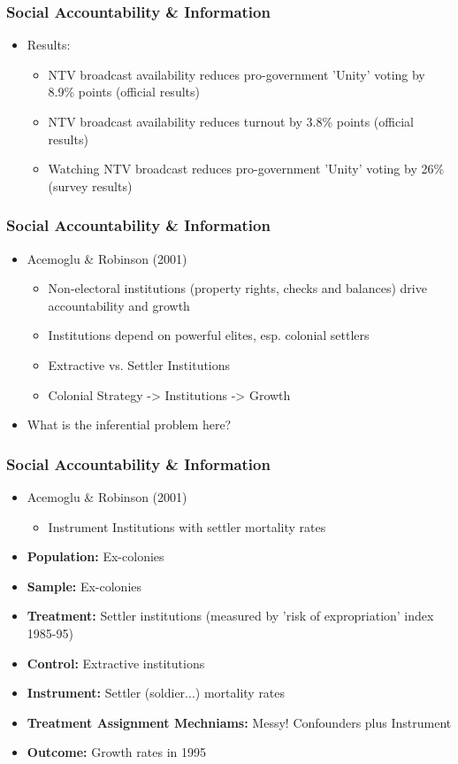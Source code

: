 \documentclass[xcolor=x11names,compress]{beamer}\usepackage[]{graphicx}\usepackage[]{color}
\renewcommand{\(}{\begin{columns}}
\renewcommand{\)}{\end{columns}}
\newcommand{\<}[1]{\begin{column}{#1}}
\renewcommand{\>}{\end{column}}
\begin{document}
\begin{frame}
\frametitle{Social Accountability \& Information}
\begin{itemize}
\item Results:
\pause
\begin{itemize}
\item NTV broadcast availability reduces pro-government 'Unity' voting by 8.9\% points (official results)
\item NTV broadcast availability reduces turnout by 3.8\% points (official results)
\item Watching NTV broadcast reduces pro-government 'Unity' voting by 26\% (survey results)
\end{itemize}
\end{itemize}
\end{frame}

\begin{frame}
\frametitle{Social Accountability \& Information}
\begin{itemize}
\item Acemoglu \& Robinson (2001)
\begin{itemize}
\item Non-electoral institutions (property rights, checks and balances) drive accountability and growth
\pause
\item Institutions depend on powerful elites, esp. colonial settlers
\pause
\item Extractive vs. Settler Institutions
\pause
\item Colonial Strategy -> Institutions -> Growth
\end{itemize}
\item What is the inferential problem here?
\end{itemize}
\end{frame}

\begin{frame}
\frametitle{Social Accountability \& Information}
\begin{itemize}
\item Acemoglu \& Robinson (2001)
\begin{itemize}
\item Instrument Institutions with settler mortality rates
\end{itemize}
\item \textbf{Population:} \pause Ex-colonies
\pause
\item \textbf{Sample:} \pause Ex-colonies
\pause
\item \textbf{Treatment:} \pause Settler institutions (measured by 'risk of expropriation' index 1985-95)
\pause
\item \textbf{Control:} \pause Extractive institutions
\pause
\item \textbf{Instrument:} \pause Settler (soldier...) mortality rates
\pause
\item \textbf{Treatment Assignment Mechniams:} \pause Messy! Confounders plus Instrument
\pause
\item \textbf{Outcome:} \pause Growth rates in 1995
\end{itemize}
\end{frame}
\end{document}
